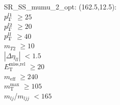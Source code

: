 SR\_SS\_mumu\_2\_opt: (162.5,12.5): \\
$p_{\text{T}}^{l1}$ $\geq 25$ \\
$p_{\text{T}}^{l2}$ $\geq 20$ \\
$p_{\text{T}}^{ll}$ $\geq 40$ \\
$m_{T2}$ $\geq 10$ \\
$|\Delta\eta_{ll}|$ $<1.5$ \\
$E_{\text{T}}^{\text{miss,rel}}$ $\geq 20$ \\
$m_{\text{eff}}$ $\geq 240$ \\
$m_{\text{T}}^{\text{max}}$ $\geq 105$ \\
$m_{lj}$/$m_{ljj}$ $<165$ \\
